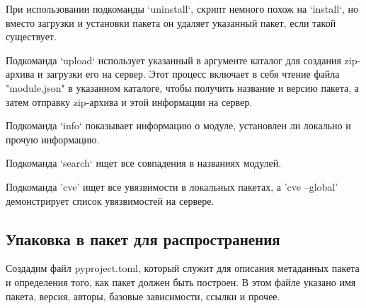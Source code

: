 При использовании подкоманды `uninstall`, скрипт немного похож на `install`, но вместо загрузки и установки пакета он удаляет указанный пакет, если такой существует.

Подкоманда `upload` использует указанный в аргументе каталог для создания zip-архива и загрузки его на сервер. Этот процесс включает в себя чтение файла "module.json" в указанном каталоге, чтобы получить название и версию пакета, а затем отправку zip-архива и этой информации на сервер.

Подкоманда `info` показывает информацию о модуле, установлен ли локально и прочую информацию.

Подкоманда `search` ищет все совпадения в названиях модулей.

Подкоманда 'cve' ищет все увязвимости в локальных пакетах, а 'cve --global' демонстрирует список увязвимостей на сервере.

\subsection{Упаковка в пакет для распространения}

Создадим файл pyproject.toml, который служит для описания метаданных пакета и определения того, как пакет должен быть построен. В этом файле указано имя пакета, версия, авторы, базовые зависимости, ссылки и прочее. 

\inputminted[fontsize=\small]{text}{../src/pyproject}



